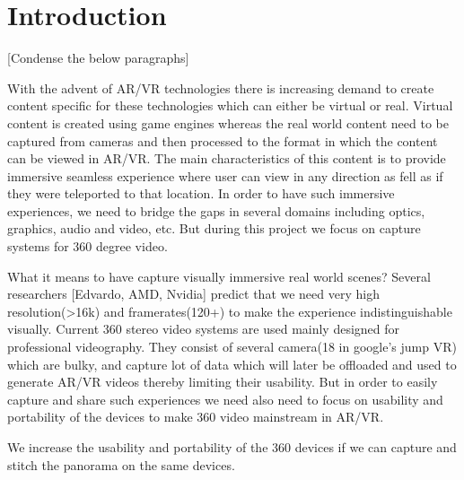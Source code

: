 \chapter{Introduction}

[Condense the below paragraphs]\newline

With the advent of AR/VR technologies there is increasing demand to create content specific for these technologies which can either be virtual or real. Virtual content is created using game engines whereas the real world content need to be captured from cameras and then processed to the format in which the content can be viewed in AR/VR. The main characteristics of this content is to provide immersive seamless experience where user can view in any direction as fell as if they were teleported to that location. In order to have such immersive experiences, we need to bridge the gaps in several domains including optics, graphics, audio and video, etc. But during this project we focus on capture systems for 360 degree video. 

What it means to have capture visually immersive real world scenes?
Several researchers [Edvardo, AMD, Nvidia] predict that we need very high resolution(>16k) and framerates(120+) to make the experience indistinguishable visually. Current 360 stereo video systems are used mainly designed for professional videography. They consist of several camera(18 in google's jump VR) which are bulky, and capture lot of data which will later be offloaded and used to generate AR/VR videos thereby limiting their usability. But in order to easily capture and share such experiences we need also need to focus on usability and portability of the devices to make 360 video mainstream in AR/VR.

We increase the usability and portability of the 360 devices if we can capture and stitch the panorama on the same devices. 

